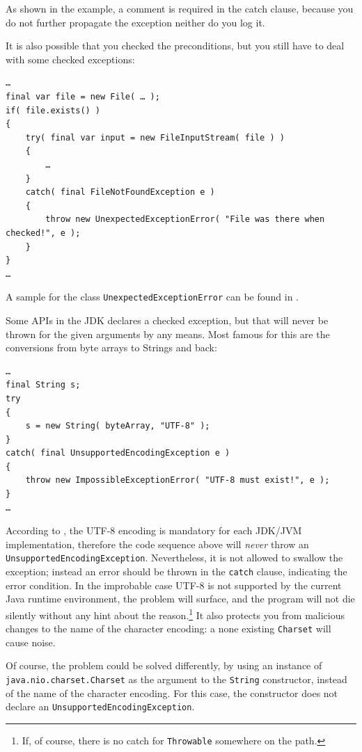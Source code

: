 \documentclass[11pt,a4paper, titlepage, parskip=half, headsepline, footsepline, cleardoublepage=current, headheight=1cm]{scrbook}
\begin{document}
As shown in the example, a comment is required in the catch clause, because you do not further propagate the exception neither do you log it.

It is also possible that you checked the preconditions, but you still have to deal with some checked exceptions:
\begin{lstlisting}
…
final var file = new File( … );
if( file.exists() )
{
    try( final var input = new FileInputStream( file ) )
    {
        …
    }
    catch( final FileNotFoundException e )
    {
        throw new UnexpectedExceptionError( "File was there when checked!", e );
    }
}
…
\end{lstlisting}

A sample for the class \lstinline|UnexpectedExceptionError| can be found in \autocite{TQUADRAT_ORG_FOUNDATION_UNEXPECTEDEXCEPTIONERROR}.

Some APIs in the JDK declares a checked exception, but that will never be thrown for the given arguments by any means. Most famous for this are the conversions from byte arrays to Strings and back:
\begin{lstlisting}
…
final String s;
try
{
    s = new String( byteArray, "UTF-8" );
}
catch( final UnsupportedEncodingException e )
{
    throw new ImpossibleExceptionError( "UTF-8 must exist!", e );
}
…
\end{lstlisting}

According to \autocite{ORACLE_DOC_CHARSET:StandardCharsets}, the UTF-8 encoding is mandatory for each JDK/JVM implementation, therefore the code sequence above will \textit{never} throw an \lstinline|UnsupportedEncodingException|. Nevertheless, it is not allowed to swallow the exception; instead an error should be thrown in the \lstinline|catch| clause, indicating the error condition. In the improbable case UTF-8 is not supported by the current Java runtime environment, the problem will surface, and the program will not die silently without any hint about the reason.\footnote{If, of course, there is no catch for \lstinline|Throwable| somewhere on the path.} It also protects you from malicious changes to the name of the character encoding: a none existing \lstinline|Charset| will cause noise.

Of course, the problem could be solved differently, by using an instance of \lstinline|java.nio.charset.Charset|\autocite{ORACLE_DOC_CHARSET_CLASS} as the argument to the \lstinline|String| constructor, instead of the name of the character encoding. For this case, the constructor does not declare an \lstinline|UnsupportedEncodingException|. 
\end{document}
